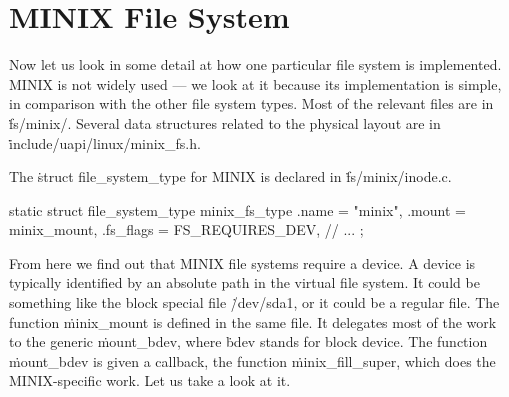 \section*{MINIX File System}

Now let us look in some detail at how one particular file system is implemented.
MINIX is not widely used ---
  we look at it because its implementation is simple,
  in comparison with the other file system types.
Most of the relevant files are in \.{fs/minix/}.
Several data structures related to the physical layout are in
  \.{include/uapi/linux/minix\_fs.h}.

The \.{struct file\_system\_type} for MINIX is declared in \.{fs/minix/inode.c}.
\begin{ccode}
static struct file_system_type minix_fs_type {
  .name = "minix",
  .mount = minix_mount,
  .fs_flags = FS_REQUIRES_DEV,
  // ...
};
\end{ccode}
From here we find out that MINIX file systems require a device.
A device is typically identified by an absolute path in the virtual file system.
It could be something like the block special file \.{/dev/sda1},
  or it could be a regular file.
The function \.{minix\_mount} is defined in the same file.
It delegates most of the work to the generic \.{mount\_bdev},
  where \.{bdev} stands for block device.
The function \.{mount\_bdev} is given a callback,
  the function \.{minix\_fill\_super},
  which does the MINIX-specific work.
Let us take a look at it.

